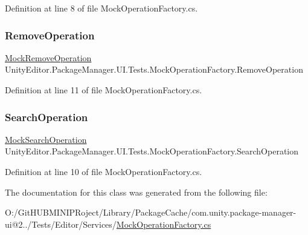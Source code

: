 Definition at line 8 of file Mock\+Operation\+Factory.\+cs.

\mbox{\label{class_unity_editor_1_1_package_manager_1_1_u_i_1_1_tests_1_1_mock_operation_factory_a35237cef3f45a643e6faea7aa5671dc2}} 
\subsubsection{\texorpdfstring{RemoveOperation}{RemoveOperation}}
{\footnotesize\ttfamily \mbox{\hyperlink{class_unity_editor_1_1_package_manager_1_1_u_i_1_1_tests_1_1_mock_remove_operation}{Mock\+Remove\+Operation}} Unity\+Editor.\+Package\+Manager.\+U\+I.\+Tests.\+Mock\+Operation\+Factory.\+Remove\+Operation\hspace{0.3cm}{\ttfamily [set]}}



Definition at line 11 of file Mock\+Operation\+Factory.\+cs.

\mbox{\label{class_unity_editor_1_1_package_manager_1_1_u_i_1_1_tests_1_1_mock_operation_factory_a69850c9fb9da5cbb687083486d539e21}} 
\subsubsection{\texorpdfstring{SearchOperation}{SearchOperation}}
{\footnotesize\ttfamily \mbox{\hyperlink{class_unity_editor_1_1_package_manager_1_1_u_i_1_1_tests_1_1_mock_search_operation}{Mock\+Search\+Operation}} Unity\+Editor.\+Package\+Manager.\+U\+I.\+Tests.\+Mock\+Operation\+Factory.\+Search\+Operation\hspace{0.3cm}{\ttfamily [set]}}



Definition at line 10 of file Mock\+Operation\+Factory.\+cs.



The documentation for this class was generated from the following file\+:\begin{DoxyCompactItemize}
\item 
O\+:/\+Git\+H\+U\+B\+M\+I\+N\+I\+P\+Roject/\+Library/\+Package\+Cache/com.\+unity.\+package-\/manager-\/ui@2../\+Tests/\+Editor/\+Services/\mbox{\hyperlink{_mock_operation_factory_8cs}{Mock\+Operation\+Factory.\+cs}}\end{DoxyCompactItemize}
